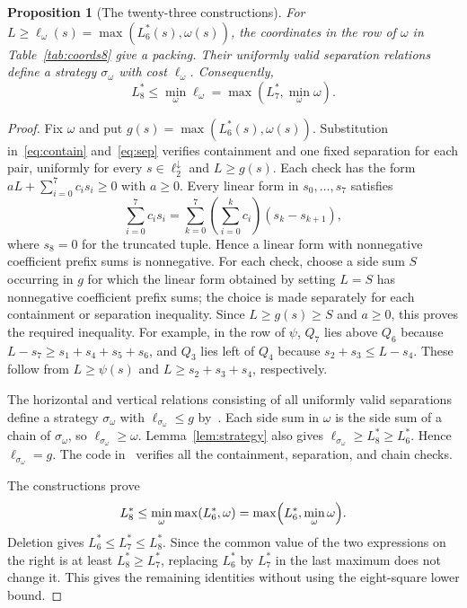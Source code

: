 \documentclass[12pt]{amsart}
\newtheorem{proposition}[theorem]{Proposition}
\theoremstyle{definition}
\theoremstyle{remark}
\numberwithin{equation}{section}
\numberwithin{figure}{section}
\numberwithin{table}{section}
\begin{document}
\begin{proposition}[The twenty-three constructions]\label{prop:eight-upper}
For $L\ge\ell_\omega(s)=\max(L_6^*(s),\omega(s))$, the coordinates in the
row of $\omega$ in Table~\ref{tab:coords8} give a packing.
Their uniformly valid separation relations define a strategy
$\sigma_\omega$ with cost $\ell_\omega$. Consequently,
\[
L_8^*\le\min_\omega\ell_\omega
=\max\left(L_7^*,\min_\omega\omega\right).
\]
\end{proposition}
\begin{proof}
Fix $\omega$ and put $g(s)=\max(L_6^*(s),\omega(s))$.
Substitution in~\eqref{eq:contain} and~\eqref{eq:sep} verifies containment
and one fixed separation for each pair, uniformly for every
$s\in\ell_2^\downarrow$ and $L\ge g(s)$. Each check has the form
$aL+\sum_{i=0}^7c_i s_i\ge0$ with $a\ge0$. Every linear form in
$s_0,\ldots,s_7$ satisfies
\begin{equation}\label{eq:prefix-test}
\sum_{i=0}^7c_i s_i
=\sum_{k=0}^7\left(\sum_{i=0}^k c_i\right)(s_k-s_{k+1}),
\end{equation}
where $s_8=0$ for the truncated tuple. Hence a linear form with nonnegative
coefficient prefix sums is nonnegative. For each check, choose a side sum $S$
occurring in $g$ for which the linear form obtained by setting $L=S$ has
nonnegative coefficient prefix sums; the choice is made separately for each
containment or separation inequality. Since $L\ge g(s)\ge S$ and $a\ge0$,
this proves the required inequality. For example, in the row of $\psi$,
$Q_7$ lies above $Q_6$ because
$L-s_7\ge s_1+s_4+s_5+s_6$, and $Q_3$ lies left of $Q_4$ because
$s_2+s_3\le L-s_4$. These follow from $L\ge\psi(s)$ and
$L\ge s_2+s_3+s_4$, respectively.

The horizontal and vertical relations consisting of all uniformly valid
separations define a strategy $\sigma_\omega$ with
$\ell_{\sigma_\omega}\le g$ by~\cite[Lemma~3.3]{BadgerSeven}.
Each side sum in $\omega$ is the side sum of a chain of $\sigma_\omega$,
so $\ell_{\sigma_\omega}\ge\omega$. Lemma~\ref{lem:strategy} also gives
$\ell_{\sigma_\omega}\ge L_8^*\ge L_6^*$. Hence $\ell_{\sigma_\omega}=g$.
The code in~\cite{BadgerCode} verifies all the containment, separation,
and chain checks.

The constructions prove
\[
L_8^*\le\min_\omega\max(L_6^*,\omega)=\max\Bigl(L_6^*,\min_\omega\omega\Bigr).
\]
Deletion gives $L_6^*\le L_7^*\le L_8^*$. Since the common value of the two
expressions on the right is at least $L_8^*\ge L_7^*$, replacing $L_6^*$ by
$L_7^*$ in the last maximum does not change it. This gives the remaining
identities without using the eight-square lower bound.
\end{proof}
\end{document}
